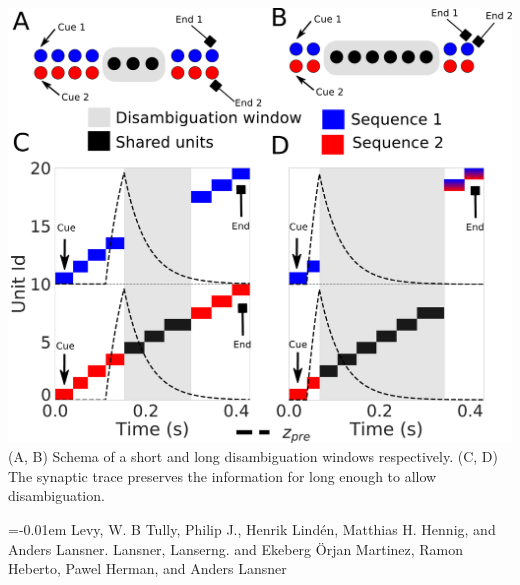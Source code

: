 \documentclass[portrait ,a4, final]{baposter}
\begin{document}
\begin{poster}
{\begin{center}
\includegraphics[scale=0.15]{disambiguation_details.pdf}
\smaller (A, B) Schema of a short and long disambiguation windows respectively. (C, D) The synaptic trace preserves the information for long enough to allow disambiguation.  
\end{center}
 
	
}



   {
    \smaller
    \vspace{-0.4em}
    
    \renewcommand{\section}[2]{\vskip 0.05em}
      \begin{thebibliography}{1}\itemsep=-0.01em
      \setlength{\baselineskip}{0.4em}
      \vspace{5pt}
      Levy, W. B 
       Tully, Philip J., Henrik Lind\'en, Matthias H. Hennig, and Anders Lansner. 
      \vspace{5pt}
        Lansner, Lanserng. and Ekeberg {\"O}rjan
      \vspace{5pt}
         Martinez, Ramon Heberto, Pawel Herman, and Anders Lansner
      \end{thebibliography} 
  }



\end{poster}
\end{document}
